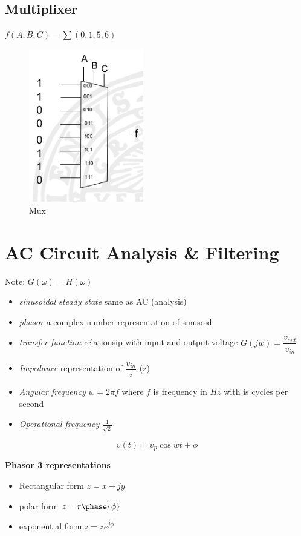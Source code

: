 \documentclass{article}
\begin{document}
\subsection{Multiplixer}
$f(A,B,C)=\sum(0,1,5,6)$
\begin{figure}[h]
    \centering
    \includegraphics[width=5cm]{image/mux.png}
    \caption{Mux}
\end{figure}


\newpage
\section{AC Circuit Analysis \& Filtering}
Note: $G(\omega)=H(\omega)$

\begin{itemize}
    \item \textit{sinusoidal steady state} same as AC (analysis)
    \item \textit{phasor} a complex number representation of sinusoid 
    \item \textit{transfer function} relationsip with input and output voltage $G(jw)=\dfrac{v_{out}}{v_{in}}$
    \item \textit{Impedance} representation of $\dfrac{v_{in}}{i}$ (z)
    \item \textit{Angular frequency} $w=2\pi f$ where $f$ is frequency in $Hz$ with is cycles per second
    \item \textit{Operational frequency} $\frac{1}{\sqrt{2}}$
\end{itemize}

\begin{equation}
    v(t)=v_p\cos{wt+\phi}
\end{equation}

\textbf{Phasor \underline{3 representations}}
\begin{itemize}
    \item Rectangular form $z=x+jy$
    \item polar form $z=r \phase{\phi}$
    \item exponential form $z=ze^{j\phi}$
\end{itemize}
\end{document}
